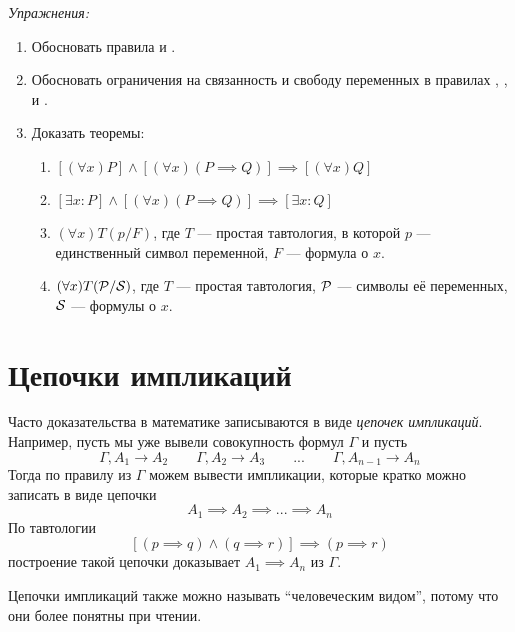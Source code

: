 \vspace{1em}
{\it Упражнения:}
\begin{enumerate}
	\item{}Обосновать правила \Eii{} и \Eee{}.
	\item{}Обосновать ограничения на связанность и свободу переменных в правилах
	\Aii{}, \Aee{}, \Eii{} и \Eee{}.

	\pagebreak
	\item{}\label{ex:obv_thm}Доказать теоремы:
	\begin{enumerate}
		\item{}$[(\forall x)P]\land[(\forall x)(P\implies Q)]
			\implies [(\forall x)Q]$\label{thm:obv_forall}
		\item{}$[\exists x:P]\land[(\forall x)(P\implies Q)]
			\implies [\exists x:Q]$
		\item{}$(\forall x)T(p/F)$, где $T$ --- простая тавтология,
		в которой $p$ --- единственный символ переменной, $F$ --- формула о $x$.
		\item{}$(\forall x)T(\mathcal P/\mathcal S)$, где $T$ --- простая тавтология,
		$\mathcal P$ --- символы её переменных, $\mathcal S$ --- формулы о $x$.\label{thm:obv_taut}
	\end{enumerate}
\end{enumerate}

\section{Цепочки импликаций}

Часто доказательства в математике записываются в виде {\it цепочек импликаций}.
Например, пусть мы уже вывели совокупность формул $\Gamma$ и пусть
\[
	\Gamma,A_1\to A_2\qquad \Gamma,A_2\to A_3
	\qquad  ... \qquad \Gamma,A_{n-1}\to A_{n}
\]
Тогда по правилу \implic{} из $\Gamma$ можем вывести импликации,
которые кратко можно записать в виде цепочки
\[
	A_1\implies A_2\implies ...\implies A_{n}
\]
По тавтологии
\[
	[(p\implies q)\land (q\implies r)]\implies (p\implies r)
\]
построение такой цепочки доказывает $A_1\implies A_{n}$ из $\Gamma$.

Цепочки импликаций также можно называть ``человеческим видом'', потому что они более
понятны при чтении.

